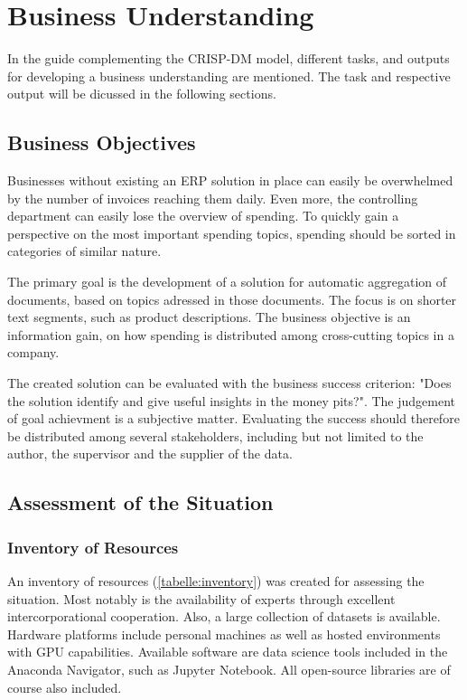 \chapter{Business Understanding}
In the guide complementing the \ac{CRISP-DM} model, different tasks, and outputs for developing a business understanding are mentioned. The task and respective output will be dicussed in the following sections.

\section{Business Objectives}
Businesses without existing an \ac{ERP} solution in place can easily be overwhelmed by the number of invoices reaching them daily. Even more, the controlling department can easily lose the overview of spending. To quickly gain a perspective on the most important spending topics, spending should be sorted in categories of similar nature.

The primary goal is the development of a solution for automatic aggregation of documents, based on topics adressed in those documents. The focus is on shorter text segments, such as product descriptions. The business objective is an information gain, on how spending is distributed among cross-cutting topics in a company.

The created solution can be evaluated with the business success criterion: "Does the solution identify and give useful insights in the money pits?". The judgement of goal achievment is a subjective matter. Evaluating the success should therefore be distributed among several stakeholders, including but not limited to the author, the supervisor and the supplier of the data.

\section{Assessment of the Situation}

\subsection{Inventory of Resources}
An inventory of resources (\ref{tabelle:inventory}) was created for assessing the situation. Most notably is the availability of experts through excellent intercorporational cooperation. Also, a large collection of datasets is available. Hardware platforms include personal machines as well as hosted environments with GPU capabilities. Available software are data science tools included in the Anaconda Navigator, such as Jupyter Notebook. All open-source libraries are of course also included.

